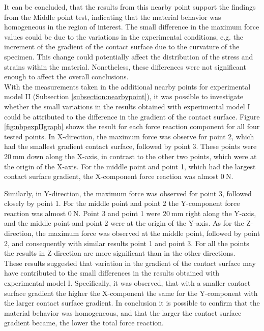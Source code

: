 It can be concluded, that the results from this nearby point support the 
findings from the Middle point test, indicating that the material behavior was
homogeneous in the region of interest. The small difference in the maximum force values could 
be due to the variations in the experimental conditions, e.g. the increment of the 
gradient of the contact surface due to the curvature of the specimen. This change 
could potentially affect the distribution of the stress and strains within the material.
Nonetheless, these differences were not significant enough to affect the overall conclusions.\\

With the measurements taken in the additional nearby points for experimental model II (Subsection \ref{subsection:nearbypoint}), 
it was possible to investigate whether the small variations in the results obtained with 
experimental model I could be attributed to the difference in the gradient of the contact surface.
Figure \ref{fig:nbpexpIIgraph} shows the result for each force reaction component for all four 
tested points. In X-direction, the maximum force was observe for point 2, which had the smallest gradient 
contact surface, followed by point 3. These points were $\SI{20}{\milli \m}$ down along the X-axis, in contrast 
to the other two points, which were at the origin of the X-axis.
For the middle point and point 1, which had the largest contact surface gradient, the 
X-component force reaction was almost $\SI{0}{\newton}$. 

Similarly, in Y-direction, the maximum force was observed for point 3, followed closely by point 1. For 
the middle point and point 2 the Y-component force reaction was almost $\SI{0}{\newton}$.  Point 3 and point 1 were 
$\SI{20}{\milli \m}$ right along the Y-axis, and the middle point and point 2 were at the origin of the Y-axis.
As for the Z-direction, the maximum force was observed at the middle point, followed by point 2, and consequently with 
similar results point 1 and point 3. For all the points the results in Z-direction are more significant than 
in the other directions.\\

These results suggested that variation in the gradient of the contact surface may have contributed
to the small differences in the results obtained with experimental model I. Specifically, it was observed, 
that with a smaller contact surface gradient the higher the X-component the same for the Y-component 
with the larger contact surface gradient. In conclusion it is possible to confirm that the material behavior was 
homogeneous, and that the larger the contact surface gradient became, the lower the total force reaction.

